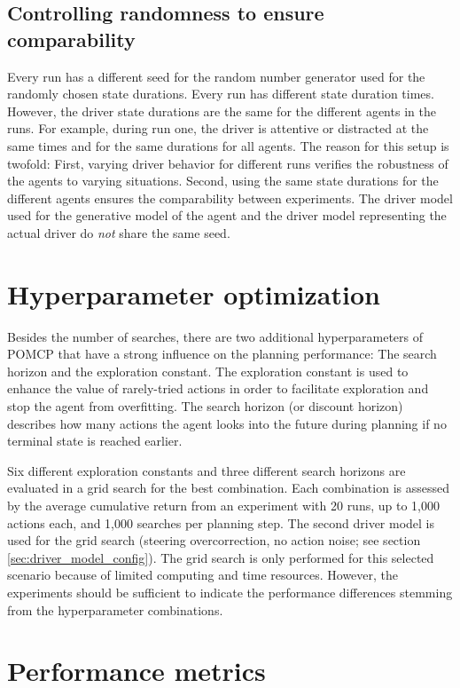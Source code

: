 \subsection{Controlling randomness to ensure comparability}

Every run has a different seed for the random number generator used for the randomly chosen state durations. Every run has different state duration times. However, the driver state durations are the same for the different agents in the runs. For example, during run one, the driver is attentive or distracted at the same times and for the same durations for all agents. The reason for this setup is twofold: First, varying driver behavior for different runs verifies the robustness of the agents to varying situations. Second, using the same state durations for the different agents ensures the comparability between experiments. The driver model used for the generative model of the agent and the driver model representing the actual driver do \emph{not} share the same seed.

\section{Hyperparameter optimization}
\label{sec:exp_hyperparams}

Besides the number of searches, there are two additional hyperparameters of POMCP that have a strong influence on the planning performance: The search horizon and the exploration constant. The exploration constant is used to enhance the value of rarely-tried actions in order to facilitate exploration and stop the agent from overfitting. The search horizon (or discount horizon) describes how many actions the agent looks into the future during planning if no terminal state is reached earlier.

Six different exploration constants and three different search horizons are evaluated in a grid search for the best combination. Each combination is assessed by the average cumulative return from an experiment with 20 runs, up to 1,000 actions each, and 1,000 searches per planning step. The second driver model is used for the grid search (steering overcorrection, no action noise; see section \ref{sec:driver_model_config}). The grid search is only performed for this selected scenario because of limited computing and time resources. However, the experiments should be sufficient to indicate the performance differences stemming from the hyperparameter combinations.

\section{Performance metrics}
\label{sec:perf_metrics}

